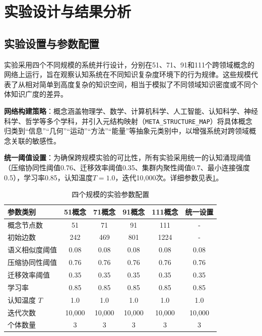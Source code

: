 \documentclass[12pt,a4paper]{article}
\begin{document}

\section{实验设计与结果分析}

\subsection{实验设置与参数配置}

实验采用四个不同规模的系统并行设计，分别在51、71、91和111个跨领域概念的网络上运行，旨在观察认知系统在不同知识复杂度环境下的行为规律。这些规模代表了从相对简单到高度复杂的知识空间，相当于模拟了不同领域知识密度或不同个体知识广度的差异。

\textbf{网络构建策略}：概念涵盖物理学、数学、计算机科学、人工智能、认知科学、神经科学、哲学等多个学科，并引入元结构映射（\texttt{META\_STRUCTURE\_MAP}）将具体概念归类到“信息”“几何”“运动”“方法”“能量”等抽象元类别中，以增强系统对跨领域概念关联的敏感性。

\textbf{统一阈值设置}：为确保跨规模实验的可比性，所有实验采用统一的认知涌现阈值（压缩协同性阈值0.76、迁移效率阈值0.35、集群内聚性阈值0.7、最小连接强度0.5），学习率0.85，认知温度$T=1.0$，迭代10,000次。详细参数见表\ref{tab:multi_scale_config}。

\begin{table}[h]
\centering
\caption{四个规模的实验参数配置}
\label{tab:multi_scale_config}
\begin{tabular}{lccccc}
\toprule
\textbf{参数类别} & \textbf{51概念} & \textbf{71概念} & \textbf{91概念} & \textbf{111概念} & \textbf{统一设置} \\
\midrule
概念节点数 & 51 & 71 & 91 & 111 & - \\
初始边数 & 242 & 469 & 801 & 1224 & - \\
语义相似度阈值 & 0.08 & 0.08 & 0.08 & 0.08 & 0.08 \\
压缩协同性阈值 & 0.76 & 0.76 & 0.76 & 0.76 & 0.76 \\
迁移效率阈值 & 0.35 & 0.35 & 0.35 & 0.35 & 0.35 \\
学习率 & 0.85 & 0.85 & 0.85 & 0.85 & 0.85 \\
认知温度 $T$ & 1.0 & 1.0 & 1.0 & 1.0 & 1.0 \\
迭代次数 & 10,000 & 10,000 & 10,000 & 10,000 & 10,000 \\
个体数量 & 3 & 3 & 3 & 3 & 3 \\
\bottomrule
\end{tabular}
\end{table}
\end{document}
